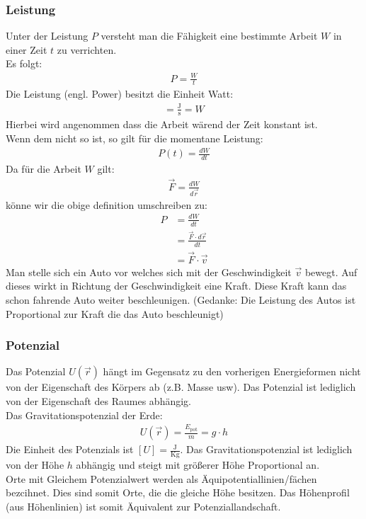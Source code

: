\documentclass{article}
\begin{document}
\subsubsection{Leistung}
Unter der Leistung $P$ versteht man die Fähigkeit eine bestimmte Arbeit $W$ in einer Zeit $t$ zu verrichten.\\
Es folgt:
\begin{align}
    P=\frac{W}{t}
\end{align} 
Die Leistung (engl. Power) besitzt die Einheit Watt:
\begin{align}
    [P]=\frac{\mathrm{J}}{\mathrm{s}}=W
\end{align}
Hierbei wird angenommen dass die Arbeit wärend der Zeit konstant ist.\\
Wenn dem nicht so ist, so gilt für die momentane Leistung:
\begin{align}
    P(t)=\frac{dW}{dt}
\end{align}
Da für die Arbeit $W$ gilt:
\begin{align}
    \vec{F}=\frac{dW}{d\vec{r}}
\end{align}
könne wir die obige definition umschreiben zu:
\begin{align}
    P&=\frac{dW}{dt}\\
    &=\frac{\vec{F}\cdot d\vec{r}}{dt}\\
    &=\vec{F}\cdot \vec{v}
\end{align}
Man stelle sich ein Auto vor welches sich mit der Geschwindigkeit $\vec{v}$ bewegt. Auf dieses wirkt in Richtung
der Geschwindigkeit eine Kraft. Diese Kraft kann das schon fahrende Auto weiter beschleunigen. (Gedanke: Die Leistung des Autos ist 
Proportional zur Kraft die das Auto beschleunigt)

\subsubsection{Potenzial}
Das Potenzial $U(\vec{r})$ hängt im Gegensatz zu den vorherigen Energieformen nicht von der Eigenschaft des Körpers ab (z.B. Masse usw).
Das Potenzial ist lediglich von der Eigenschaft des Raumes abhängig.\\
Das Gravitationspotenzial der Erde:
\begin{align}
    U(\vec{r})=\frac{E_\mathrm{pot}}{m}=g\cdot h
\end{align}
Die Einheit des Potenzials ist $[U]=\frac{\mathrm{J}}{\mathrm{Kg}}$.
Das Gravitationspotenzial ist lediglich von der Höhe $h$ abhängig und steigt mit größerer Höhe Proportional an.\\
Orte mit Gleichem Potenzialwert werden als Äquipotentiallinien/fächen bezcihnet. Dies sind somit Orte, die die gleiche Höhe
besitzen. Das Höhenprofil (aus Höhenlinien) ist somit Äquivalent zur Potenziallandschaft.\\
\end{document}
